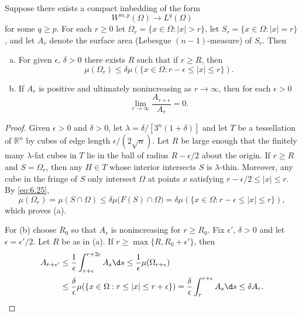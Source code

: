 \begin{theorem}
  Suppose there exists a compact imbedding of the form
  \begin{equation}\label{eq:6.26}
    W^{m,p}(\Omega) \to L^q(\Omega)
  \end{equation}
  for some $q\geq p$. For each $r\geq 0$ let $\Omega_r = \{x\in\Omega:|x|>r\}$,
  let $S_r = \{x\in\Omega:|x|=r\}$, and let $A_r$ denote the surface area
  (Lebesgue $(n-1)$-measure) of $S_r$. Then
  \begin{enumerate}[(a)]
    \item For given $\epsilon$, $\delta>0$ there exists $R$ such that
      if $r\geq R$, then
      \[ \mu(\Omega_r) \leq \delta \mu(\{x\in\Omega: r-\epsilon\leq |x|\leq r\}). \]
    \item If $A_r$ is positive and ultimately nonincreasing as $r\to\infty$,
      then for each $\epsilon>0$
      \[ \lim_{r\to\infty} \frac{A_{r+\epsilon}}{A_r} = 0. \]
  \end{enumerate}
\end{theorem}

\begin{proof}
  Given $\epsilon>0$ and $\delta>0$, let $\lambda=\delta/[3^n(1+\delta)]$
  and let $T$ be a tessellation of $\mathbb{R}^n$ by cubes of edge
  length $\epsilon/(2\sqrt{n})$. Let $R$ be large enough that the finitely
  many $\lambda$-fat cubes in $T$ lie in the ball of radius $R-\epsilon/2$
  about the origin. If $r\geq R$ and $S=\Omega_r$, then any $H\in T$
  whose interior intersects $S$ is $\lambda$-thin. Moreover, any cube in the
  fringe of $S$ only intersect $\Omega$ at points $x$ satisfying 
  $r-\epsilon/2\leq |x|\leq r$. By \eqref{eq:6.25},
  \[ \mu(\Omega_r) = \mu(S\cap\Omega) \leq \delta\mu\bigl(F(S)\cap\Omega\bigr)
      = \delta\mu(\{x\in\Omega: r-\epsilon\leq |x|\leq r\}), \]
  which proves (a).

  For (b) choose $R_0$ so that $A_r$ is nonincreasing for $r\geq R_0$.
  Fix $\epsilon'$, $\delta>0$ and let $\epsilon=\epsilon'/2$.
  Let $R$ be as in (a). If $r\geq \max\{R,R_0+\epsilon'\}$, then
  \begin{align*}
    A_{r+\epsilon'}
    & \leq \frac{1}{\epsilon} \int_{r+\epsilon}^{r+2\epsilon} A_s \d s
      \leq \frac{1}{\epsilon} \mu(\Omega_{r+\epsilon}) \\
    & \leq \frac{\delta}{\epsilon} \mu(\{x\in\Omega: r\leq |x|\leq r+\epsilon\})
      = \frac{\delta}{\epsilon} \int_r^{r+\epsilon} A_s \d s \leq \delta A_r.
  \end{align*}
\end{proof}